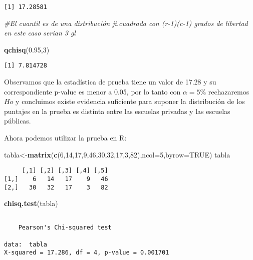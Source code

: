 \documentclass[a4paper,oneside,openany]{book}
\newenvironment{Shaded}{\begin{snugshade}}{\end{snugshade}}
\newcommand{\KeywordTok}[1]{\textcolor[rgb]{0.13,0.29,0.53}{\textbf{#1}}}
\newcommand{\DataTypeTok}[1]{\textcolor[rgb]{0.13,0.29,0.53}{#1}}
\newcommand{\DecValTok}[1]{\textcolor[rgb]{0.00,0.00,0.81}{#1}}
\newcommand{\FloatTok}[1]{\textcolor[rgb]{0.00,0.00,0.81}{#1}}
\newcommand{\CommentTok}[1]{\textcolor[rgb]{0.56,0.35,0.01}{\textit{#1}}}
\newcommand{\OtherTok}[1]{\textcolor[rgb]{0.56,0.35,0.01}{#1}}
\newcommand{\NormalTok}[1]{#1}
\begin{document}
\begin{verbatim}
[1] 17.28581
\end{verbatim}

\begin{Shaded}
\begin{Highlighting}[]
\CommentTok{#El cuantil es de una distribución ji.cuadrada con (r-1)(c-1) grados de libertad en este caso serian 3 gl}

\KeywordTok{qchisq}\NormalTok{(}\FloatTok{0.95}\NormalTok{,}\DecValTok{3}\NormalTok{)}
\end{Highlighting}
\end{Shaded}

\begin{verbatim}
[1] 7.814728
\end{verbatim}

Observamos que la estadística de prueba tiene un valor de 17.28 y su
correspondiente p-value es menor a 0.05, por lo tanto con \(\alpha=5\%\)
rechazaremos \(Ho\) y concluimos existe evidencia suficiente para
suponer la distribución de los puntajes en la prueba es distinta entre
las escuelas privadas y las escuelas públicas.

Ahora podemos utilizar la prueba en R:

\begin{Shaded}
\begin{Highlighting}[]
\NormalTok{tabla<-}\KeywordTok{matrix}\NormalTok{(}\KeywordTok{c}\NormalTok{(}\DecValTok{6}\NormalTok{,}\DecValTok{14}\NormalTok{,}\DecValTok{17}\NormalTok{,}\DecValTok{9}\NormalTok{,}\DecValTok{46}\NormalTok{,}\DecValTok{30}\NormalTok{,}\DecValTok{32}\NormalTok{,}\DecValTok{17}\NormalTok{,}\DecValTok{3}\NormalTok{,}\DecValTok{82}\NormalTok{),}\DataTypeTok{ncol=}\DecValTok{5}\NormalTok{,}\DataTypeTok{byrow=}\OtherTok{TRUE}\NormalTok{)}
\NormalTok{tabla}
\end{Highlighting}
\end{Shaded}

\begin{verbatim}
     [,1] [,2] [,3] [,4] [,5]
[1,]    6   14   17    9   46
[2,]   30   32   17    3   82
\end{verbatim}

\begin{Shaded}
\begin{Highlighting}[]
\KeywordTok{chisq.test}\NormalTok{(tabla)}
\end{Highlighting}
\end{Shaded}

\begin{verbatim}

    Pearson's Chi-squared test

data:  tabla
X-squared = 17.286, df = 4, p-value = 0.001701
\end{verbatim}
\end{document}
